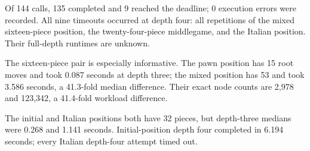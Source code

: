 Of 144 calls, 135 completed and 9 reached the deadline; 0 execution errors were recorded. All nine timeouts occurred at depth four: all repetitions of the mixed sixteen-piece position, the twenty-four-piece middlegame, and the Italian position. Their full-depth runtimes are unknown.

The sixteen-piece pair is especially informative. The pawn position has 15 root moves and took 0.087 seconds at depth three; the mixed position has 53 and took 3.586 seconds, a 41.3-fold median difference. Their exact node counts are 2,978 and 123,342, a 41.4-fold workload difference.

The initial and Italian positions both have 32 pieces, but depth-three medians were 0.268 and 1.141 seconds. Initial-position depth four completed in 6.194 seconds; every Italian depth-four attempt timed out.
